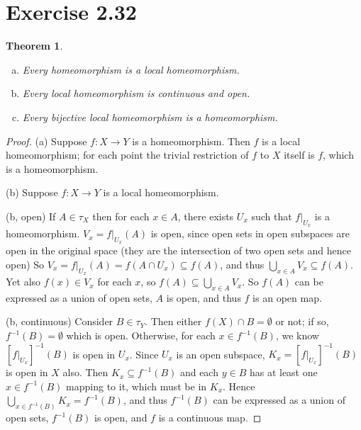 \documentclass{article}
\newtheorem{theorem}[subsection]{Theorem}
\theoremstyle{definition}
\begin{document}
\section{Exercise 2.32}
\begin{theorem}
\begin{enumerate}[(a)]
\item Every homeomorphism is a local homeomorphism.
\item Every local homeomorphism is continuous and open.
\item Every bijective local homeomorphism is a homeomorphism.
\end{enumerate}
\end{theorem}
\begin{proof}
(a) Suppose $f : X \to Y$ is a homeomorphism. Then $f$ is a local homeomorphism; 
for each point the trivial restriction of $f$ to $X$ itself is $f$, which is a 
homeomorphism.

(b) Suppose $f : X \to Y$ is a local homeomorphism. 

(b, open)
If $A \in \tau_X$ then for each $x \in A$, there exists $U_x$ such that $f|_{U_x}$
is a homeomorphism. $V_x = f|_{U_x}(A)$ is open, since open sets in open subspaces
are open in the original space (they are the intersection of two open sets and 
hence open) So $V_x = f|_{U_x}(A) = f(A \cap U_x) \subseteq f(A)$, and thus 
$\bigcup_{x \in A} V_x \subseteq f(A)$. Yet also $f(x) \in V_x$ for each $x$, so
$f(A) \subseteq \bigcup_{x\in A} V_x$. So $f(A)$ can be expressed as a union of
open sets, $A$ is open, and thus $f$ is an open map.

(b, continuous)
Consider $B \in \tau_Y$. Then either $f(X) \cap B = \emptyset$ or not; if so, 
$f^{-1}(B)=\emptyset$ which is open. Otherwise, for each $x \in f^{-1}(B)$, we
know $[f|_{U_x}]^{-1}(B)$ is open in $U_x$. Since $U_x$ is an open subspace, 
$K_x = [f|_{U_x}]^{-1} (B)$ is open in $X$ also. Then $K_x \subseteq f^{-1}(B)$ and
each $y \in B$ has at least one $x \in f^{-1}(B)$ mapping to it, which must be in
$K_x$. Hence $\bigcup_{x \in f^{-1}(B)} K_x = f^{-1} (B)$, and thus $f^{-1}(B)$
can be expressed as a union of open sets, $f^{-1}(B)$ is open, and $f$ is a 
continuous map.



\end{proof}
\end{document}
